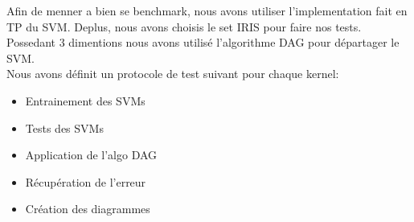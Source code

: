 \documentclass[fontsize=10pt, twoside=no]{scrartcl} %
\begin{document}
Afin de menner a bien se benchmark, nous avons utiliser l'implementation fait en TP du SVM. Deplus, nous avons choisis le set IRIS pour faire nos tests. Possedant 3 dimentions nous avons utilisé l'algorithme DAG pour départager le SVM.\\

\noindent Nous avons définit un protocole de test suivant pour chaque kernel:
\begin{itemize}
	\item Entrainement des SVMs
	\item Tests des SVMs
	\item Application de l'algo DAG
	\item Récupération de l'erreur
	\item Création des diagrammes
\end{itemize}
\end{document}
